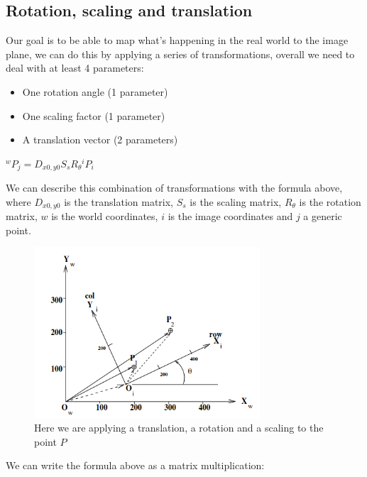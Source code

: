 \subsection{Rotation, scaling and translation}

Our goal is to be able to map what's happening in the real world to the image plane, we can do this by applying a series of transformations, overall we need to deal with at least 4 parameters:
\begin{itemize} 
    \item One rotation angle (1 parameter)
    \item One scaling factor (1 parameter)
    \item A translation vector (2 parameters)
\end{itemize}

\({}^w P_j = D_{x0,y0} S_s R_\theta {}^i P_i\)

We can describe this combination of transformations with the formula above, where \(D_{x0,y0}\) is the translation matrix, \(S_s\) is the scaling matrix, \(R_\theta\) is the rotation matrix, \(w\) is the world coordinates, \(i\) is the image coordinates and \(j\) a generic point.

\begin{figure}[H]
    \centering
    \includegraphics[width=0.75\textwidth]{Figures/comb.png}
    \caption{Here we are applying a translation, a rotation and a scaling to the point \(P\)}
    \label{fig:comb}
\end{figure}

We can write the formula above as a matrix multiplication:

